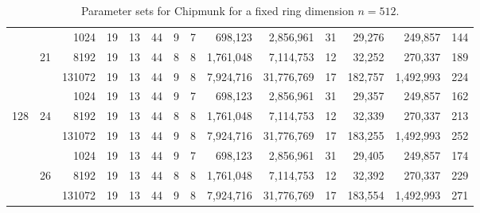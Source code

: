 \begin{table}
\begin{tabular}{ccr|cc|cccrr|crr|c}
      &       &   1024 &         19 &        13 &        44 &          9 &       7 &        698,123 &  2,856,961 &    31 &       29,276 &   249,857 & 144 \\%
      &    21 &   8192 &         19 &        13 &       44 &          8 &       8 &      1,761,048 &  7,114,753 &    12 &       32,252 &   270,337 & 189 \\%
      &       & 131072 &         19 &        13 &       44 &          9 &       8 &      7,924,716 & 31,776,769 &    17 &      182,757 & 1,492,993 & 224 \\\cline{2-14}
  
      &       &   1024 &         19 &        13 &       44 &          9 &       7 &        698,123 &  2,856,961 &    31 &       29,357 &   249,857 & 162 \\%
  128 &    24 &   8192 &         19 &        13 &       44 &          8 &       8 &      1,761,048 &  7,114,753 &    12 &       32,339 &   270,337 & 213 \\%
      &       & 131072 &         19 &        13 &       44 &          9 &       8 &      7,924,716 & 31,776,769 &    17 &      183,255 & 1,492,993 & 252 \\\cline{2-14}
  
      &       &   1024 &         19 &        13 &       44 &          9 &       7 &        698,123 &  2,856,961 &    31 &       29,405 &   249,857 & 174 \\%
      &    26 &   8192 &         19 &        13 &       44 &          8 &       8 &      1,761,048 &  7,114,753 &    12 &       32,392 &   270,337 & 229 \\%
      &       & 131072 &         19 &        13 &       44 &          9 &       8 &      7,924,716 & 31,776,769 &    17 &      183,554 & 1,492,993 & 271 \\\bottomrule
    \end{tabular}
    \caption{Parameter sets for Chipmunk for a fixed ring dimension $n=512$.}\label{tab:param}
  \end{table}
\egroup


